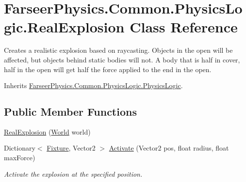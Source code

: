 \hypertarget{class_farseer_physics_1_1_common_1_1_physics_logic_1_1_real_explosion}{\section{Farseer\+Physics.\+Common.\+Physics\+Logic.\+Real\+Explosion Class Reference}
\label{class_farseer_physics_1_1_common_1_1_physics_logic_1_1_real_explosion}
}


Creates a realistic explosion based on raycasting. Objects in the open will be affected, but objects behind static bodies will not. A body that is half in cover, half in the open will get half the force applied to the end in the open.  




Inherits \hyperlink{class_farseer_physics_1_1_common_1_1_physics_logic_1_1_physics_logic}{Farseer\+Physics.\+Common.\+Physics\+Logic.\+Physics\+Logic}.

\subsection*{Public Member Functions}
\begin{DoxyCompactItemize}
\item 
\hyperlink{class_farseer_physics_1_1_common_1_1_physics_logic_1_1_real_explosion_a171e231be2e86a44579213b6973b2336}{Real\+Explosion} (\hyperlink{class_farseer_physics_1_1_dynamics_1_1_world}{World} world)
\item 
Dictionary$<$ \hyperlink{class_farseer_physics_1_1_dynamics_1_1_fixture}{Fixture}, Vector2 $>$ \hyperlink{class_farseer_physics_1_1_common_1_1_physics_logic_1_1_real_explosion_a68484317a2e1cd6e8453b46f57593d76}{Activate} (Vector2 pos, float radius, float max\+Force)
\begin{DoxyCompactList}\small\item\em Activate the explosion at the specified position. \end{DoxyCompactList}\end{DoxyCompactItemize}
